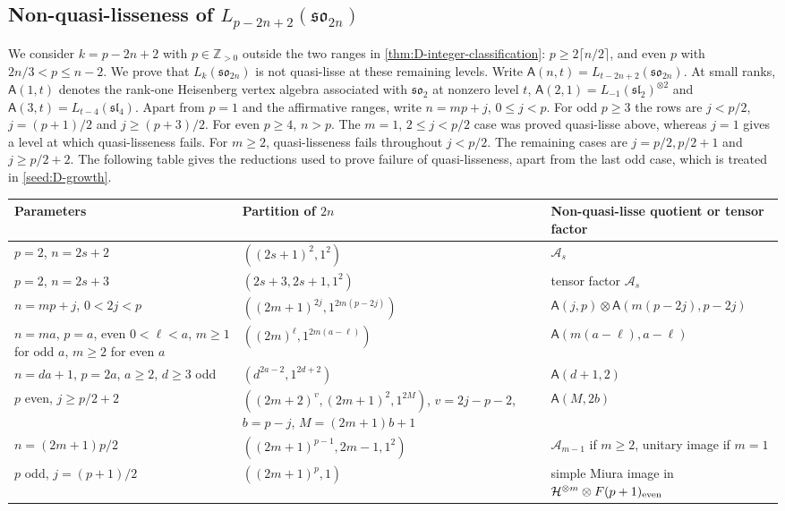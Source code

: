 \documentclass[11pt,a4paper]{amsart}
\numberwithin{equation}{section}
\theoremstyle{definition}
\theoremstyle{remark}
\newcommand{\Z}{\mathbb Z}
\newcommand{\sog}{\mathfrak{so}}
\newcommand{\slg}{\mathfrak{sl}}
\begin{document}
\subsection{\texorpdfstring{Non-quasi-lisseness of $L_{p-2n+2}(\sog_{2n})$}{Non-quasi-lisseness of L(p-2n+2)(so(2n))}}\label{sec:D-exclusions}\label{D:negative-factors}\label{D:negative-assembly}
We consider $k=p-2n+2$ with $p\in\Z_{>0}$ outside the two ranges
in \cref{thm:D-integer-classification}: $p\ge2\lceil n/2\rceil$,
and even $p$ with $2n/3<p\le n-2$.
We prove that $L_k(\sog_{2n})$ is not quasi-lisse at these remaining levels.
Write $\mathsf A(n,t)=L_{t-2n+2}(\sog_{2n})$. At small ranks,
$\mathsf A(1,t)$ denotes the rank-one Heisenberg vertex algebra
associated with $\sog_2$ at nonzero level $t$,
$\mathsf A(2,1)=L_{-1}(\slg_2)^{\otimes2}$ and
$\mathsf A(3,t)=L_{t-4}(\slg_4)$.
Apart from $p=1$ and the affirmative ranges, write $n=mp+j$, $0\le j<p$.
For odd $p\ge3$ the rows are $j<p/2$, $j=(p+1)/2$ and
$j\ge(p+3)/2$. For even $p\ge4$, $n>p$. The $m=1$, $2\le j<p/2$
case was proved quasi-lisse above, whereas $j=1$ gives a level at
which quasi-lisseness fails. For $m\ge2$, quasi-lisseness fails
throughout $j<p/2$. The remaining cases are $j=p/2,p/2+1$ and
$j\ge p/2+2$. The following table gives the reductions used to prove
failure of quasi-lisseness, apart from the last odd case, which is
treated in \cref{seed:D-growth}.
\begin{longtable}{@{}>{\raggedright\arraybackslash}p{}>{\raggedright\arraybackslash}p{}>{\raggedright\arraybackslash}p{}@{}}
\toprule
Parameters & Partition of $2n$ & Non-quasi-lisse quotient or tensor factor\\\midrule\endhead
$p=2$, $n=2s+2$ & $((2s+1)^2,1^2)$ & $\mathcal A_s$\\ \midrule
$p=2$, $n=2s+3$ & $(2s+3,2s+1,1^2)$ & tensor factor $\mathcal A_s$\\ \midrule
$n=mp+j$, $0<2j<p$ & $((2m+1)^{2j},1^{2m(p-2j)})$
 & $\mathsf A(j,p)\otimes\mathsf A(m(p-2j),p-2j)$\\ \midrule
$n=ma$, $p=a$, even $0<\ell<a$, $m\ge1$ for odd $a$, $m\ge2$ for even $a$ & $((2m)^\ell,1^{2m(a-\ell)})$
 & $\mathsf A(m(a-\ell),a-\ell)$\\ \midrule
$n=da+1$, $p=2a$, $a\ge2$, $d\ge3$ odd & $(d^{2a-2},1^{2d+2})$
 & $\mathsf A(d+1,2)$\\ \midrule
$p$ even, $j\ge p/2+2$ & $((2m+2)^v,(2m+1)^2,1^{2M})$,
$v=2j-p-2$, $b=p-j$, $M=(2m+1)b+1$ & $\mathsf A(M,2b)$\\ \midrule
$n=(2m+1)p/2$ & $((2m+1)^{p-1},2m-1,1^2)$
 & $\mathcal A_{m-1}$ if $m\ge2$, unitary image if $m=1$\\ \midrule
$p$ odd, $j=(p+1)/2$ & $((2m+1)^p,1)$ & simple Miura image in $\mathcal H^{\otimes m}\otimes F(p+1)_{\rm even}$\\
\bottomrule
\end{longtable}
\end{document}
